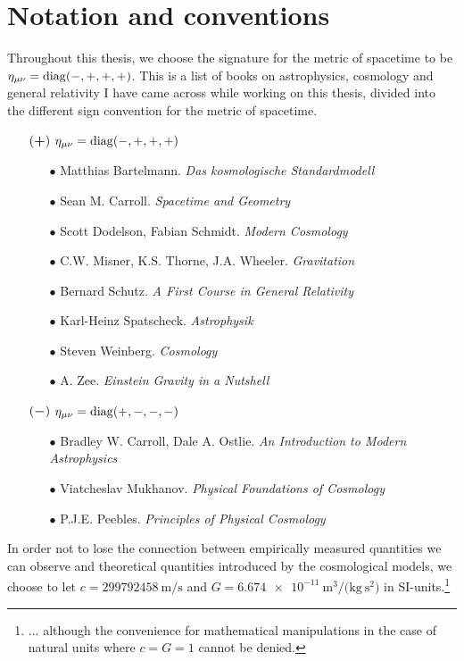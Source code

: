 \chapter*{Notation and conventions}
\thispagestyle{empty}

Throughout this thesis, we choose the signature for the metric of spacetime to be \\
${\eta_{\mu\nu} = \operatorname{diag}(-,+,+,+)}$.
This is a list of books on astrophysics, cosmology and general relativity I have came across while working on this thesis, divided into the different sign convention for the metric of spacetime. 
\begin{itemize}
    \item[$(\boldsymbol{+})$] $\eta_{\mu \nu} = \operatorname{diag}(-,+,+,+)$
    \begin{itemize}
        \item[$\bullet$] Matthias Bartelmann. \textit{Das kosmologische Standardmodell} \cite{Bartelmann2019}
        \item[$\bullet$] Sean M. Carroll. \textit{Spacetime and Geometry} \cite{SeanCarroll2019}
        \item[$\bullet$] Scott Dodelson, Fabian Schmidt. \textit{Modern Cosmology} \cite{Dodelson2020}
        \item[$\bullet$] C.W. Misner, K.S. Thorne, J.A. Wheeler. \textit{Gravitation} \cite{MTW2017}
        \item[$\bullet$] Bernard Schutz. \textit{A First Course in General Relativity} \cite{Schutz2009}
        \item[$\bullet$] Karl-Heinz Spatscheck. \textit{Astrophysik} \cite{Spatschek2017}
        \item[$\bullet$] Steven Weinberg. \textit{Cosmology} \cite{Weinberg2008}
        \item[$\bullet$] A. Zee. \textit{Einstein Gravity in a Nutshell} \cite{Zee2013}
    \end{itemize}
    \item[$(\boldsymbol{-})$] $\eta_{\mu \nu} = \operatorname{diag}(+,-,-,-)$
    \begin{itemize}
        \item[$\bullet$] Bradley W. Carroll, Dale A. Ostlie. \textit{An Introduction to Modern Astrophysics} \cite{BradleyCarroll2007}
        \item[$\bullet$] Viatcheslav Mukhanov. \textit{Physical Foundations of Cosmology} \cite{Mukhanov2005}
        \item[$\bullet$] P.J.E. Peebles. \textit{Principles of Physical Cosmology} \cite{Peebles1993}
    \end{itemize}
\end{itemize}

\noindent In order not to lose the connection between empirically measured quantities we can observe and theoretical quantities introduced by the cosmological models, we choose to let $c = \SI{299 792 458}{\meter/\second}$ and $G = \SI{6.674e-11}{\meter^3/(\kilogram \ \second^2)}$ in SI-units.\footnote{... although the convenience for mathematical manipulations in the case of natural units where $c = G = 1$ cannot be denied.}
